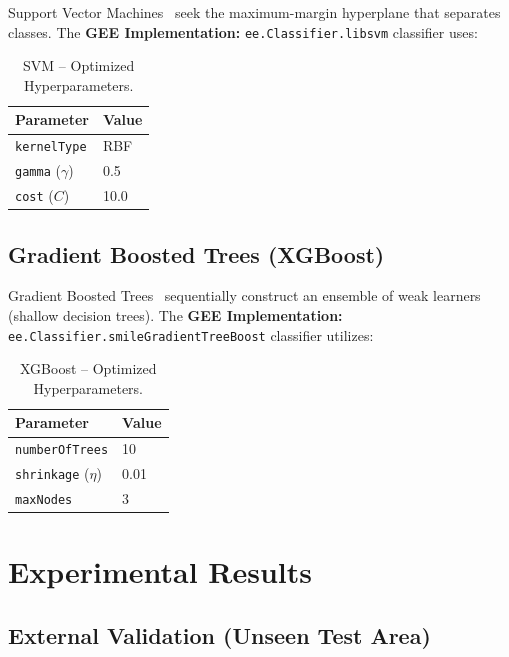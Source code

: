 \documentclass[12pt, a4paper, twocolumn]{article}
\begin{document}
Support Vector Machines~\cite{cortes1995support} seek the maximum-margin hyperplane that separates classes. The \textbf{GEE Implementation:} \texttt{ee.Classifier.libsvm} classifier uses:

\begin{table}[H]
\centering
\caption{SVM -- Optimized Hyperparameters.}
\label{tab:svm_params}
\begin{tabular}{@{}ll@{}}
\toprule
\textbf{Parameter} & \textbf{Value} \\
\midrule
\texttt{kernelType} & RBF \\
\texttt{gamma} ($\gamma$) & 0.5 \\
\texttt{cost} ($C$) & 10.0 \\
\bottomrule
\end{tabular}
\end{table}

\subsection{Gradient Boosted Trees (XGBoost)}
\label{subsec:xgb}

Gradient Boosted Trees~\cite{chen2016xgboost} sequentially construct an ensemble of weak learners (shallow decision trees). The \textbf{GEE Implementation:} \texttt{ee.Classifier.smileGradientTreeBoost} classifier utilizes:

\begin{table}[H]
\centering
\caption{XGBoost -- Optimized Hyperparameters.}
\label{tab:xgb_params}
\begin{tabular}{@{}ll@{}}
\toprule
\textbf{Parameter} & \textbf{Value} \\
\midrule
\texttt{numberOfTrees} & 10 \\
\texttt{shrinkage} ($\eta$) & 0.01 \\
\texttt{maxNodes} & 3 \\
\bottomrule
\end{tabular}
\end{table}

\section{Experimental Results}
\label{sec:results}

\subsection{External Validation (Unseen Test Area)}
\end{document}
